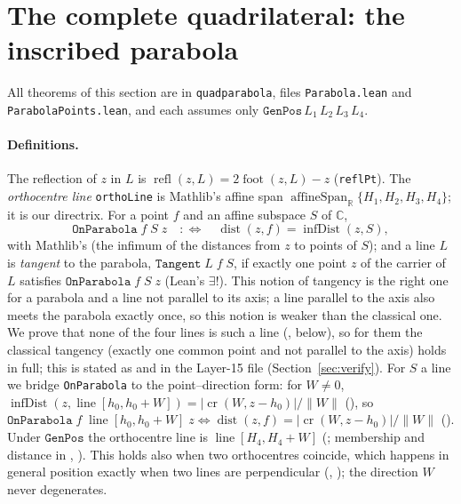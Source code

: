 \documentclass[11pt]{article}
\theoremstyle{definition}
\theoremstyle{remark}
\newcommand{\lean}[1]{\texttt{#1}}
\newcommand{\RR}{\mathbb{R}}
\newcommand{\CC}{\mathbb{C}}
\begin{document}
\section{The complete quadrilateral: the inscribed parabola}\label{sec:parabola}

All theorems of this section are in \lean{quadparabola}, files \lean{Parabola.lean} and
\lean{ParabolaPoints.lean}, and each assumes only $\lean{GenPos}\,L_1\,L_2\,L_3\,L_4$.

\paragraph{Definitions.} The reflection of $z$ in $L$ is $\operatorname{refl}(z,L)=2\operatorname{foot}(z,L)-z$
(\lean{reflPt}). The \emph{orthocentre line} \lean{orthoLine} is Mathlib's affine span
$\operatorname{affineSpan}_\RR\{H_1,H_2,H_3,H_4\}$; it is our directrix. For a point $f$ and an affine
subspace $S$ of $\CC$,
\[
  \lean{OnParabola}\;f\;S\;z\quad:\Longleftrightarrow\quad \operatorname{dist}(z,f)=\operatorname{infDist}(z,S),
\]
with Mathlib's  (the infimum of the distances from $z$ to points of $S$); and a
line $L$ is \emph{tangent} to the parabola, $\lean{Tangent}\;L\;f\;S$, if exactly one point $z$ of the
carrier of $L$ satisfies $\lean{OnParabola}\;f\;S\;z$ (Lean's $\exists!$). This notion of tangency is
the right one for a parabola and a line not parallel to its axis; a line parallel to the axis also
meets the parabola exactly once, so this notion is weaker than the classical one. We prove that none
of the four lines is such a line (, below), so for them the classical
tangency (exactly one common point and not parallel to the axis) holds in full; this is stated as
 and  in the Layer-15 file
(Section~\ref{sec:verify}). For $S$ a line we bridge \lean{OnParabola} to the
point--direction form: for $W\neq0$,
$\operatorname{infDist}(z,\operatorname{line}[h_0,h_0+W])=|\operatorname{cr}(W,z-h_0)|/\|W\|$
(), so
$\lean{OnParabola}\;f\;\operatorname{line}[h_0,h_0+W]\;z\iff \operatorname{dist}(z,f)=|\operatorname{cr}(W,z-h_0)|/\|W\|$
(). Under $\lean{GenPos}$ the orthocentre line is
$\operatorname{line}[H_4,H_4+W]$ (; membership and distance in
, ). This holds also when two
orthocentres coincide, which happens in general position exactly when two lines are perpendicular
(\cite{paperE}, ); the direction $W$ never degenerates.
\end{document}
